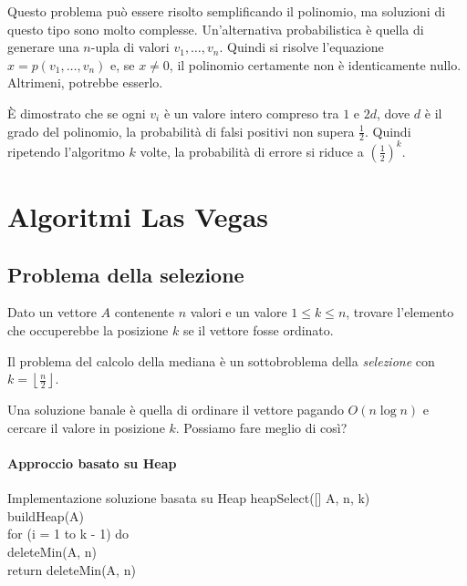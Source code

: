 \noindent
Questo problema può essere risolto semplificando il polinomio, ma soluzioni
di questo tipo sono molto complesse. Un'alternativa probabilistica è quella
di generare una $n$-upla di valori $v_1,\dots,v_n$. Quindi si risolve
l'equazione $x=p(v_1,\dots,v_n)$ e, se $x\neq 0$, il polinomio certamente
non è identicamente nullo. Altrimeni, potrebbe esserlo.

È dimostrato che se ogni $v_i$ è un valore intero compreso tra $1$ e $2d$,
dove $d$ è il grado del polinomio, la probabilità di falsi positivi non
supera $\frac{1}{2}$. Quindi ripetendo l'algoritmo $k$ volte, la
probabilità di errore si riduce a $\left(\frac{1}{2}\right)^k$.

\section{Algoritmi Las Vegas}
\subsection{Problema della selezione}
\begin{problem}
    Dato un vettore $A$ contenente $n$ valori e un valore $1\leq k\leq n$,
    trovare l'elemento che occuperebbe la posizione $k$ se il vettore fosse
    ordinato.
\end{problem}
\begin{note}
    Il problema del calcolo della mediana è un sottobroblema della
    \emph{selezione} con $k=\left\lfloor\frac{n}{2}\right\rfloor$.
\end{note}

\noindent
Una soluzione banale è quella di ordinare il vettore pagando $O(n\log n)$ e
cercare il valore in posizione $k$. Possiamo fare meglio di così?

\paragraph{Approccio basato su Heap}
\begin{minicode}{Implementazione soluzione basata su Heap}
\ind{} heapSelect([] A,  n,  k)\\
    buildHeap(A)\\
    \indf for (i = 1 to k - 1) do\\
        deleteMin(A, n)\\
    \indf return deleteMin(A, n)
\end{minicode}

